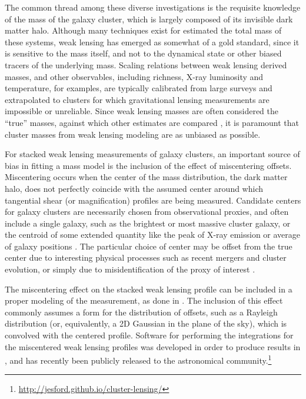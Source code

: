 \documentclass{emulateapj}
\begin{document}
The common thread among these diverse investigations is the requisite knowledge of the mass of the galaxy cluster, which is largely composed of its invisible dark matter halo. Although many techniques exist for estimated the total mass of these systems, weak lensing has emerged as somewhat of a gold standard, since it is sensitive to the mass itself, and not to the dynamical state or other biased tracers of the underlying mass. Scaling relations between weak lensing derived masses, and other observables, including richness, X-ray luminosity and temperature, for examples, are typically calibrated from large surveys and extrapolated to clusters for which gravitational lensing measurements are impossible or unreliable. Since weak lensing masses are often considered the ``true'' masses, against which other estimates are compared \citep[e.g.][]{Leauthaud10, vonderLinden14, Hoekstra15}, it is paramount that cluster masses from weak lensing modeling are as unbiased as possible.

For stacked weak lensing measurements of galaxy clusters, an important source of bias in fitting a mass model is the inclusion of the effect of miscentering offsets. Miscentering occurs when the center of the mass distribution, the dark matter halo, does not perfectly coincide with the assumed center around which tangential shear (or magnification) profiles are being measured. Candidate centers for galaxy clusters are necessarily chosen from observational proxies, and often include a single galaxy, such as the brightest or most massive cluster galaxy, or the centroid of some extended quantity like the peak of X-ray emission or average of galaxy positions \citep{George12}. The particular choice of center may be offset from the true center due to interesting physical processes such as recent mergers and cluster evolution, or simply due to misidentification of the proxy of interest \citep{Johnston07}. 

The miscentering effect on the stacked weak lensing profile can be included in a proper modeling of the measurement, as done in \citet{Johnston07, George12, Ford14, Ford15}. The inclusion of this effect commonly assumes a form for the distribution of offsets, such as a Rayleigh distribution (or, equivalently, a 2D Gaussian in the plane of the sky), which is convolved with the centered profile. Software for performing the integrations for the miscentered weak lensing profiles was developed in order to produce results in \citet{Ford14, Ford15}, and has recently been publicly released to the astronomical community.\footnote{\url{http://jesford.github.io/cluster-lensing/}}
\end{document}
